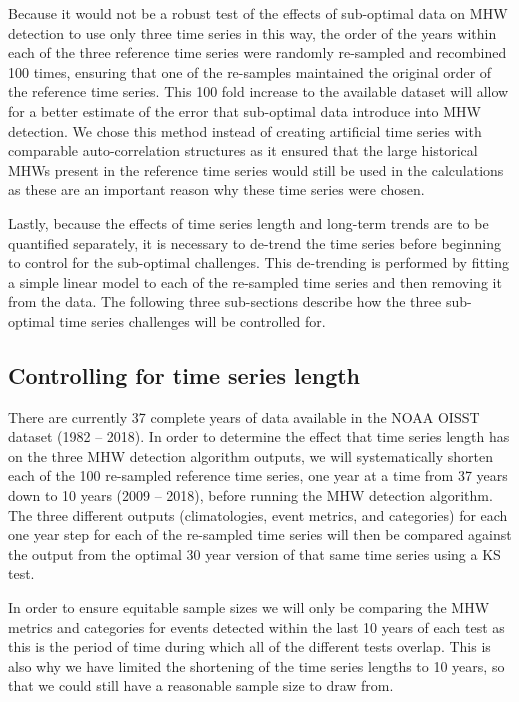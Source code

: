 \documentclass[utf8]{frontiersSCNS} %
\begin{document}
Because it would not be a robust test of the effects of sub-optimal data
on MHW detection to use only three time series in this way, the order of
the years within each of the three reference time series were randomly
re-sampled and recombined 100 times, ensuring that one of the re-samples
maintained the original order of the reference time series. This 100
fold increase to the available dataset will allow for a better estimate
of the error that sub-optimal data introduce into MHW detection. We
chose this method instead of creating artificial time series with
comparable auto-correlation structures as it ensured that the large
historical MHWs present in the reference time series would still be used
in the calculations as these are an important reason why these time
series were chosen.

Lastly, because the effects of time series length and long-term trends
are to be quantified separately, it is necessary to de-trend the time
series before beginning to control for the sub-optimal challenges. This
de-trending is performed by fitting a simple linear model to each of the
re-sampled time series and then removing it from the data. The following
three sub-sections describe how the three sub-optimal time series
challenges will be controlled for.

\hypertarget{controlling-for-time-series-length}{%
\subsection{Controlling for time series
length}\label{controlling-for-time-series-length}}

There are currently 37 complete years of data available in the NOAA
OISST dataset (1982 -- 2018). In order to determine the effect that time
series length has on the three MHW detection algorithm outputs, we will
systematically shorten each of the 100 re-sampled reference time series,
one year at a time from 37 years down to 10 years (2009 -- 2018), before
running the MHW detection algorithm. The three different outputs
(climatologies, event metrics, and categories) for each one year step
for each of the re-sampled time series will then be compared against the
output from the optimal 30 year version of that same time series using a
KS test.

In order to ensure equitable sample sizes we will only be comparing the
MHW metrics and categories for events detected within the last 10 years
of each test as this is the period of time during which all of the
different tests overlap. This is also why we have limited the shortening
of the time series lengths to 10 years, so that we could still have a
reasonable sample size to draw from.
\end{document}

